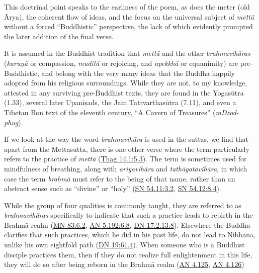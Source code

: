 \documentclass[12pt,openany]{book}%
\begin{document}
This doctrinal point speaks to the earliness of the poem, as does the meter (old Ārya), the coherent flow of ideas, and the focus on the universal subject of \textit{\textsanskrit{mettā}} without a forced “Buddhistic” perspective, the lack of which evidently prompted the later addition of the final verse.

It is assumed in the Buddhist tradition that \textit{\textsanskrit{mettā}} and the other \textit{\textsanskrit{brahmavihāras}} (\textit{\textsanskrit{karuṇā}} or compassion, \textit{\textsanskrit{muditā}} or rejoicing, and \textit{\textsanskrit{upekkhā}} or equanimity) are pre-Buddhistic, and belong with the very many ideas that the Buddha happily adopted from his religious surroundings. While they are not, to my knowledge, attested in any surviving pre-Buddhist texts, they are found in the \textsanskrit{Yogasūtra} (1.33), several later \textsanskrit{Upaniṣads}, the Jain \textsanskrit{Tattvarthasūtra} (7.11), and even a Tibetan Bon text of the eleventh century, “A Cavern of Treasures” (\textit{mDzod-phug}).

If we look at the way the word \textit{\textsanskrit{brahmavihāra}} is used in the suttas, we find that apart from the Mettasutta, there is one other verse where the term particularly refers to the practice of \textit{\textsanskrit{mettā}} (\href{https://suttacentral.net/thag14.1/en/sujato\#5.3}{Thag 14.1:5.3}). The term is sometimes used for mindfulness of breathing, along with \textit{\textsanskrit{ariyavihāra}} and \textit{\textsanskrit{tathāgatavihāra}}, in which case the term \textit{\textsanskrit{brahmā}} must refer to the being of that name, rather than an abstract sense such as “divine” or “holy” (\href{https://suttacentral.net/sn54.11/en/sujato\#3.2}{SN 54.11:3.2}, \href{https://suttacentral.net/sn54.12/en/sujato\#8.4}{SN 54.12:8.4}).

While the group of four qualities is commonly taught, they are referred to as \textit{\textsanskrit{brahmavihāras}} specifically to indicate that such a practice leads to rebirth in the \textsanskrit{Brahmā} realm (\href{https://suttacentral.net/mn83/en/sujato\#6.2}{MN 83:6.2}, \href{https://suttacentral.net/an5.192/en/sujato\#6.8}{AN 5.192:6.8}, \href{https://suttacentral.net/dn17/en/sujato\#2.13.8}{DN 17:2.13.8}). Elsewhere the Buddha clarifies that such practices, which he did in his past life, do not lead to \textsanskrit{Nibbāna}, unlike his own eightfold path (\href{https://suttacentral.net/dn19/en/sujato\#61.4}{DN 19:61.4}). When someone who is a Buddhist disciple practices them, then if they do not realize full enlightenment in this life, they will do so after being reborn in the \textsanskrit{Brahmā} realm (\href{https://suttacentral.net/an4.125/en/sujato}{AN 4.125}, \href{https://suttacentral.net/an4.126/en/sujato}{AN 4.126})
\end{document}
